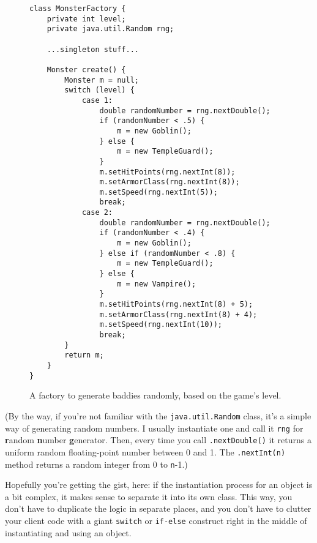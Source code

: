 \begin{figure}
\begin{Verbatim}[fontsize=\footnotesize,samepage=true,frame=single]
class MonsterFactory {
    private int level;
    private java.util.Random rng;
    
    ...singleton stuff...

    Monster create() {
        Monster m = null;
        switch (level) {
            case 1:
                double randomNumber = rng.nextDouble();
                if (randomNumber < .5) {
                    m = new Goblin();
                } else {
                    m = new TempleGuard();
                }
                m.setHitPoints(rng.nextInt(8));
                m.setArmorClass(rng.nextInt(8));
                m.setSpeed(rng.nextInt(5));
                break;
            case 2:
                double randomNumber = rng.nextDouble();
                if (randomNumber < .4) {
                    m = new Goblin();
                } else if (randomNumber < .8) {
                    m = new TempleGuard();
                } else {
                    m = new Vampire();
                }
                m.setHitPoints(rng.nextInt(8) + 5);
                m.setArmorClass(rng.nextInt(8) + 4);
                m.setSpeed(rng.nextInt(10));
                break;
        }
        return m;
    }
}
\end{Verbatim}
\caption{A factory to generate baddies randomly, based on the game's level.}
\label{fig:monsterFactoryCode}
\end{figure}

(By the way, if you're not familiar with the \texttt{java.util.Random} class,
it's a simple way of generating random numbers. I usually instantiate one and
call it \texttt{rng} for \textbf{r}andom \textbf{n}umber \textbf{g}enerator.
Then, every time you call \texttt{.nextDouble()} it returns a uniform random
floating-point number between 0 and 1. The \texttt{.nextInt(n)} method returns
a random integer from 0 to \texttt{n}-1.)

Hopefully you're getting the gist, here: if the instantiation process for an
object is a bit complex, it makes sense to separate it into its own class.
This way, you don't have to duplicate the logic in separate places, and you
don't have to clutter your client code with a giant \texttt{switch} or
\texttt{if-else} construct right in the middle of instantiating and using an
object.

